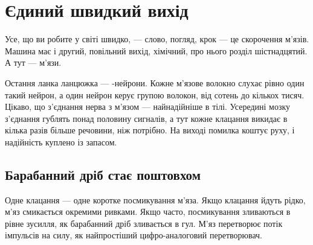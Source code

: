 \chapter{Єдиний швидкий вихід}

Усе, що ви робите у світі швидко, --- слово, погляд, крок --- це скорочення м'язів. Машина має і другий, повільний вихід, хімічний, про нього розділ шістнадцятий. А тут --- м'язи.

Остання ланка ланцюжка --- -нейрони. Кожне м'язове волокно слухає рівно один такий нейрон, а один нейрон керує групою волокон, від сотень до кількох тисяч. Цікаво, що з'єднання нерва з м'язом --- найнадійніше в тілі. Усередині мозку з'єднання гублять понад половину сигналів, а тут кожне клацання викидає в кілька разів більше речовини, ніж потрібно. На виході помилка коштує руху, і надійність куплено із запасом.

\section*{Барабанний дріб стає поштовхом}

Одне клацання --- одне коротке посмикування м'яза. Якщо клацання йдуть рідко, м'яз смикається окремими ривками. Якщо часто, посмикування зливаються в рівне зусилля, як барабанний дріб зливається в гул. М'яз перетворює потік імпульсів на силу, як найпростіший цифро-аналоговий перетворювач.

